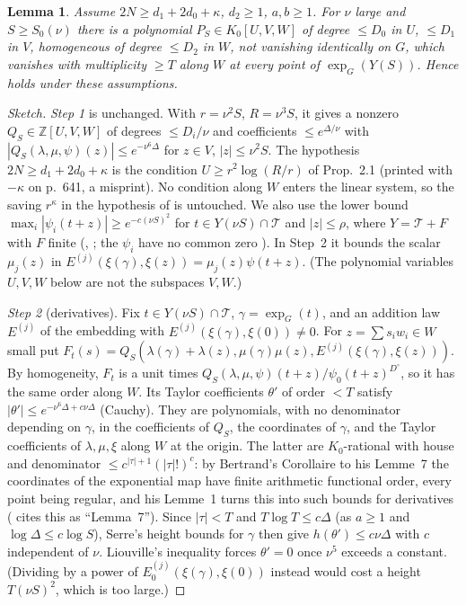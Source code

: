 \documentclass[11pt]{amsart}
\newtheorem{lemma}[theorem]{Lemma}
\theoremstyle{definition}
\newcommand{\Z}{\mathbb{Z}}
\begin{document}
\begin{lemma}\label{lem:U}
Assume $2N\ge d_1+2d_0+\kappa$, $d_2\ge1$, $a,b\ge1$. For $\nu$ large and $S\ge S_0(\nu)$ there is a polynomial
$P_S\in K_0[U,V,W]$ of degree $\le D_0$ in $U$, $\le D_1$ in $V$, homogeneous of degree $\le D_2$ in $W$, not vanishing
identically on $G$, which vanishes with multiplicity $\ge T$ along $W$ at every point of $\exp_G(Y(S))$. Hence
\cite[Prop.~6.1]{W88} holds under these assumptions.
\end{lemma}

\begin{proof}[Sketch]
\emph{Step 1} is \cite[Prop.~2.1 and p.~640]{W83} unchanged. With $r=\nu^2S$, $R=\nu^3S$, it gives a nonzero
$Q_S\in\Z[U,V,W]$ of degrees $\le D_i/\nu$ and coefficients $\le e^{\Delta/\nu}$ with $|Q_S(\lambda,\mu,\psi)(z)|\le
e^{-\nu^6\Delta}$ for $z\in V$, $|z|\le\nu^2S$. The hypothesis $2N\ge d_1+2d_0+\kappa$ is the condition
$U\ge r^2\log(R/r)$ of Prop.~2.1 (printed with $-\kappa$ on p.~641, a misprint). No condition along $W$ enters the linear
system, so the saving $r^{\kappa}$ in the hypothesis of \cite[Prop.~2.1, p.~633]{W83} is untouched. We also use the lower bound
$\max_i|\psi_i(t+z)|\ge e^{-c(\nu S)^2}$ for $t\in Y(\nu S)\cap\mathcal T$ and $|z|\le\rho$, where $Y=\mathcal T+F$ with $F$
finite (\cite[p.~640]{W83}, \cite[Lemme~1.2.2]{W79}; the $\psi_i$ have no common zero \cite[Prop.~8]{Se79}). In Step~2 it
bounds the scalar $\mu_j(z)$ in $E^{(j)}(\xi(\gamma),\xi(z))=\mu_j(z)\psi(t+z)$. (The polynomial variables $U,V,W$ below
are not the subspaces $V,W$.)

\emph{Step 2} (derivatives). Fix $t\in Y(\nu S)\cap\mathcal T$, $\gamma=\exp_G(t)$, and an addition law $E^{(j)}$ of the
embedding with $E^{(j)}(\xi(\gamma),\xi(0))\ne0$. For $z=\sum s_iw_i\in W$ small put
$F_t(s)=Q_S(\lambda(\gamma)+\lambda(z),\mu(\gamma)\mu(z),E^{(j)}(\xi(\gamma),\xi(z)))$. By homogeneity, $F_t$ is a unit
times $Q_S(\lambda,\mu,\psi)(t+z)/\psi_0(t+z)^{D^\circ}$, so it has the same order along $W$. Its Taylor coefficients
$\theta'$ of order $<T$ satisfy $|\theta'|\le e^{-\nu^6\Delta+c\nu\Delta}$ (Cauchy). They are polynomials, with no
denominator depending on $\gamma$, in the coefficients of $Q_S$, the coordinates of $\gamma$, and the Taylor coefficients
of $\lambda,\mu,\xi$ along $W$ at the origin. The latter are $K_0$-rational with house and denominator
$\le c^{|\tau|+1}(|\tau|!)^{c}$: by Bertrand's Corollaire to his Lemme~7 \cite[App.~I, p.~177]{W79} the coordinates of the
exponential map have finite arithmetic functional order, every point being regular, and his Lemme~1 \cite[App.~I,
pp.~166--167]{W79} turns this into such bounds for derivatives (\cite[p.~396]{W88} cites this as ``Lemma~7''). Since
$|\tau|<T$ and $T\log T\le c\Delta$ (as $a\ge1$ and $\log\Delta\le c\log S$), Serre's height bounds for $\gamma$ then give
$h(\theta')\le c\nu\Delta$ with $c$ independent of $\nu$. Liouville's inequality forces $\theta'=0$ once $\nu^5$ exceeds a constant. (Dividing by a
power of $E_0^{(j)}(\xi(\gamma),\xi(0))$ instead would cost a height $T(\nu S)^2$, which is too large.)


\end{proof}
\end{document}
